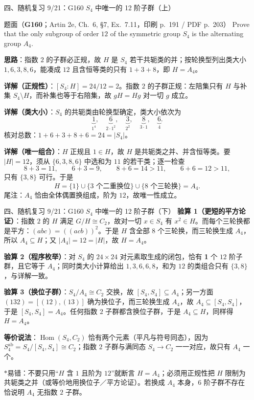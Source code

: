 \documentclass[aspectratio=169,10pt,fontset=none]{ctexbeamer}
\newcommand{\ex}[1]{\textcolor{accent}{\footnotesize\bfseries #1}}
\newcommand{\key}[1]{\textcolor{ink}{\bfseries #1}}
\newcommand{\starpt}{\textcolor{accent}{\bfseries$\ast$}}
\begin{document}
\begin{frame}[t]{四、随机复习 9/21：G160 $S_4$ 中唯一的 12 阶子群（上）}
\label{ex:G160}
\scriptsize
\begin{block}{\footnotesize 题面（\ex{G160}；Artin 2e, Ch.~6, §7, Ex.~7.11，印刷 p.~191 / PDF p.~203）}
Prove that the only subgroup of order $12$ of the symmetric group $S_4$ is the alternating group $A_4$.
\end{block}
\key{思路}：指数 $2$ 的子群必正规，故 $H$ 是 $S_4$ 若干共轭类的并；按轮换型列出类大小 $1,6,3,8,6$，能凑成 $12$ 且含恒等类的只有 $1+3+8$，即 $H=A_4$。

\key{详解（正规性）}：$[S_4:H]=24/12=2$。指数 $2$ 的子群正规：左陪集只有 $H$ 与补集 $S_4\setminus H$，而补集也等于右陪集，故 $gH=Hg$ 对一切 $g$ 成立。

\key{详解（类大小）}：$S_4$ 的共轭类由轮换型确定，类大小依次为
\[ \underbrace{1}_{1^4},\quad \underbrace{6}_{2\cdot1^2},\quad \underbrace{3}_{2^2},\quad \underbrace{8}_{3\cdot1},\quad \underbrace{6}_{4}. \]
核对总数：$1+6+3+8+6=24=|S_4|$。

\key{详解（唯一组合）}：$H$ 正规且 $1\in H$，故 $H$ 是共轭类之并、并含恒等类。要 $|H|=12$，须从 $\{6,3,8,6\}$ 中选和为 $11$ 的若干类；逐一检查
\[ 8+3=11,\qquad 6+3=9,\qquad 8+6=14>11,\qquad 6+6=12>11, \]
只有 $\{3,8\}$ 可行。于是
\[ H=\{1\}\cup\{\text{3 个二重换位}\}\cup\{\text{8 个三轮换}\}=A_4 . \]
尾注：$A_4$ 恰由全体偶置换组成，阶为 $12$，故唯一性成立。
\end{frame}

\begin{frame}[t]{四、随机复习 9/21：G160 $S_4$ 中唯一的 12 阶子群（下）}
\scriptsize
\key{验算 1（更短的平方论证）}：指数 $2$ 的 $H$ 满足 $G/H\cong C_2$，故对一切 $x\in S_4$ 有 $x^2\in H$。而每个三轮换都是平方：$(abc)=((acb))^2$。于是 $H$ 含全部 $8$ 个三轮换，而三轮换生成 $A_4$，所以 $A_4\subseteq H$；又 $|A_4|=12=|H|$，故 $H=A_4$。

\key{验算 2（程序枚举）}：对 $S_4$ 的 $24\times24$ 对元素取生成的闭包，恰有 \textbf{1} 个 $12$ 阶子群，且它等于 $A_4$；同时类大小计算给出 $1,3,6,6,8$，和为 $12$ 的类组合只有 $\{3,8\}$，与详解一致。

\key{验算 3（换位子群）}：$S_4/A_4\cong C_2$ 交换，故 $[S_4,S_4]\subseteq A_4$；另一方面 $(132)=[(12),(13)]$ 确为换位子，而三轮换生成 $A_4$，故 $A_4\subseteq[S_4,S_4]$，于是 $[S_4,S_4]=A_4$。任何指数 $2$ 子群都含换位子群，于是 $A_4\subseteq H$，同样得 $H=A_4$。

\key{等价说法}：$\operatorname{Hom}(S_4,C_2)$ 恰有两个元素（平凡与符号同态），因为 $S_4^{\mathrm{ab}}=S_4/[S_4,S_4]\cong C_2$；指数 $2$ 子群与满同态 $S_4\to C_2$ 一一对应，故只有 $A_4$ 一个。

\starpt 易错：不要只用“$H$ 含 $1$ 且阶为 $12$”就断言 $H=A_4$；必须用正规性把 $H$ 限制为共轭类之并（或等价地用换位子／平方论证）。若换成 $A_4$ 本身，$6$ 阶子群不存在恰说明 $A_4$ 无指数 $2$ 子群。
\end{frame}
\end{document}
